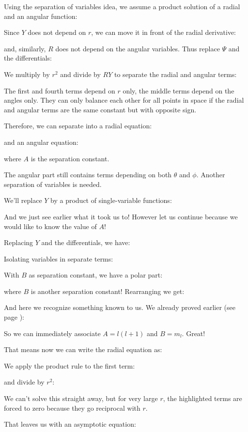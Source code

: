 	Using the separation of variables idea, we assume a product solution of a radial and an angular function:
	
	Since $Y$ does not depend on $r$, we can move it in front of the radial derivative:
	
	and, similarly, $R$ does not depend on the angular variables. Thus replace $\Psi$ and the differentials:
	
	We multiply by $r^2$ and divide by $RY$ to separate the radial and angular terms:
	
	The first and fourth terms depend on $r$ only, the middle terms depend on the angles only. They can only balance each other for all points in space if the radial and angular terms are the same constant but with opposite sign.
	
	Therefore, we can separate into a radial equation:
	
	and an angular equation:
	
	where $A$ is the separation constant.
	
	The angular part still contains terms depending on both $\theta$ and $\phi$. Another separation of variables is needed.
	
	We'll replace $Y$ by a product of single-variable functions:
	
	And we just see earlier what it took us to! However let us continue because we would like to know the value of $A$!
	
	Replacing $Y$ and the differentials, we have:
	
	Isolating variables in separate terms:
	
	With $B$ as separation constant, we have a polar part:
	
	where $B$ is another separation constant! Rearranging we get:
	
	And here we recognize something known to us. We already proved earlier (see page \pageref{polar equation rigid rotator}):
	
	So we can immediately associate $A=l(l+1)$ and $B=m_l$. Great!
	
	That means now we can write the radial equation as:
	
	We apply the product rule to the first term:
	
	and divide by $r^2$:
	
	We can't solve this straight away, but for very large $r$, the highlighted terms are forced to zero because they go reciprocal with $r$.
	
	That leaves us with an asymptotic equation:
	
